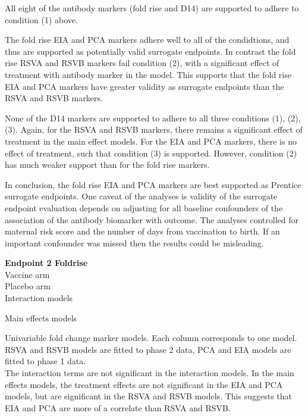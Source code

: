 \documentclass[11pt]{article}
\begin{document}
All eight of the antibody markers (fold rise and D14) are supported to adhere to condition (1) above.

The fold rise EIA and PCA markers adhere well to all of the condidtions, and thus are supported as potentially valid surrogate endpoints.
In contrast the fold rise RSVA and RSVB markers fail condition (2), with a significant effect of treatment with antibody marker in the model. This supports that the
fold rise EIA and PCA markers have greater validity as surrogate endpoints than the RSVA and RSVB markers.

None of the D14 markers are supported to adhere to all three conditions (1), (2), (3). Again, for the RSVA and RSVB markers, there remains a significant effect of treatment in the main effect models. For the EIA and PCA markers, there is no effect of treatment, such that condition (3) is supported. However, condition (2) has much weaker support than for the fold rise markers.

In conclusion, the fold rise EIA and PCA markers are best supported as Prentice surrogate endpoints. One caveat of the analyses is validity of the surrogate endpoint evaluation depends on adjusting for all baseline confounders of the association of the antibody biomarker with outcome. The analyses controlled for maternal risk score and the number of days from vaccination to birth. If an important confounder was missed then the results could be misleading.

\begin{table}[H]
\tiny{
    \textbf{Endpoint 2 Foldrise}\\
    
    Vaccine arm\\
    
    
    \vspace{5pt}
    Placebo arm\\
    

    \vspace{5pt}
    Interaction models\\
    \setlength{\tabcolsep}{.5ex}

    \vspace{5pt}
    Main effects models\\
    \setlength{\tabcolsep}{.5ex}
    
}
    \caption{Univariable fold change marker models. Each column corresponds to one model. RSVA and RSVB models are fitted to phase 2 data, PCA and EIA models are fitted to phase 1 data. \\
    The interaction terms are not significant in the interaction models. In the main effects models, the treatment effects are not significant in the EIA and PCA models, but are significant in the RSVA and RSVB models. This suggests that EIA and PCA are more of a correlate than RSVA and RSVB.  
}
    \label{tab:y2_log10d14overd0_prentice}
\end{table}
\end{document}
